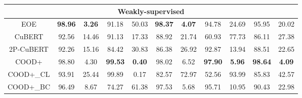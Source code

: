 \begin{table*}[thb]
\begin{adjustbox}{width=0.9\textwidth}
\begin{tabular}{|ccccccccccc|}
\multicolumn{11}{|c|}{\textbf{Weakly-supervised}}                                                                                                                                                                                                                                                                                                                                                                           \\ \hline
\multicolumn{1}{|c|}{EOE}                  & \multicolumn{1}{c|}{\textbf{98.96}}  & \multicolumn{1}{c|}{\textbf{3.26}}   & \multicolumn{1}{c|}{91.18}           & \multicolumn{1}{c|}{50.03}           & \multicolumn{1}{c|}{\textbf{98.37}}  & \multicolumn{1}{c|}{\textbf{4.07}}   & \multicolumn{1}{c|}{94.78}  & \multicolumn{1}{c|}{24.69}           & \multicolumn{1}{c|}{95.95}           & 20.02           \\ \hline
\multicolumn{1}{|c|}{CuBERT}               & \multicolumn{1}{c|}{92.56}           & \multicolumn{1}{c|}{14.46}           & \multicolumn{1}{c|}{91.13}           & \multicolumn{1}{c|}{17.33}           & \multicolumn{1}{c|}{88.92}           & \multicolumn{1}{c|}{21.74}           & \multicolumn{1}{c|}{60.93}           & \multicolumn{1}{c|}{77.73}           & \multicolumn{1}{c|}{86.11}           & 27.38           \\ \hline
\multicolumn{1}{|c|}{2P-CuBERT}            & \multicolumn{1}{c|}{92.26}           & \multicolumn{1}{c|}{15.16}           & \multicolumn{1}{c|}{84.42}  & \multicolumn{1}{c|}{30.83}  & \multicolumn{1}{c|}{86.38}           & \multicolumn{1}{c|}{26.92}           & \multicolumn{1}{c|}{92.87}           & \multicolumn{1}{c|}{13.94}  & \multicolumn{1}{c|}{88.51}  & 22.65  \\ \hline
\multicolumn{1}{|c|}{COOD+}                & \multicolumn{1}{c|}{98.80}           & \multicolumn{1}{c|}{4.30}            & \multicolumn{1}{c|}{\textbf{99.53}}  & \multicolumn{1}{c|}{\textbf{0.40}}   & \multicolumn{1}{c|}{98.02}           & \multicolumn{1}{c|}{6.52}            & \multicolumn{1}{c|}{\textbf{97.90}}  & \multicolumn{1}{c|}{\textbf{5.96}}   & \multicolumn{1}{c|}{\textbf{98.64}}  & \textbf{4.09}   \\
\multicolumn{1}{|c|}{COOD+\_CL}            & \multicolumn{1}{c|}{93.91}           & \multicolumn{1}{c|}{25.44}           & \multicolumn{1}{c|}{99.89}           & \multicolumn{1}{c|}{0.17}            & \multicolumn{1}{c|}{82.57}           & \multicolumn{1}{c|}{72.97}           & \multicolumn{1}{c|}{52.56}           & \multicolumn{1}{c|}{93.99}           & \multicolumn{1}{c|}{85.83}           & 42.57           \\
\multicolumn{1}{|c|}{COOD+\_BC}            & \multicolumn{1}{c|}{96.49}           & \multicolumn{1}{c|}{8.67}            & \multicolumn{1}{c|}{74.27}           & \multicolumn{1}{c|}{61.38}           & \multicolumn{1}{c|}{97.53}           & \multicolumn{1}{c|}{5.68}            & \multicolumn{1}{c|}{95.71}           & \multicolumn{1}{c|}{10.95}           & \multicolumn{1}{c|}{90.43}           & 22.98           \\ \hline



\end{tabular}
\end{adjustbox}
\end{table*}
